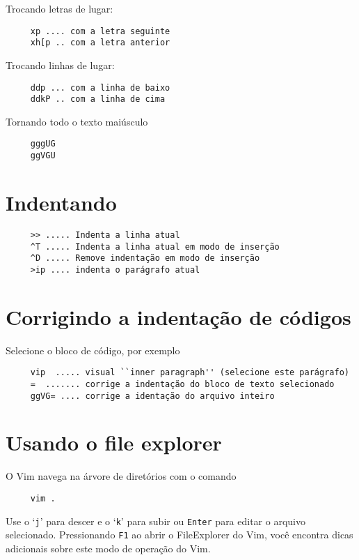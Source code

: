 Trocando letras de lugar:

\begin{verbatim}
     xp .... com a letra seguinte
     xh[p .. com a letra anterior
\end{verbatim}

Trocando linhas de lugar:

\begin{verbatim}
     ddp ... com a linha de baixo
     ddkP .. com a linha de cima
\end{verbatim}

Tornando todo o texto maiúsculo

\begin{verbatim}
     gggUG
     ggVGU
\end{verbatim}

\section{Indentando }

\begin{verbatim}
     >> ..... Indenta a linha atual
     ^T ..... Indenta a linha atual em modo de inserção
     ^D ..... Remove indentação em modo de inserção
     >ip .... indenta o parágrafo atual
\end{verbatim}

\section{Corrigindo a indentação de códigos}
\label{Corrigindo a indentação de códigos}
Selecione o bloco de código, por exemplo

\begin{verbatim}
     vip  ..... visual ``inner paragraph'' (selecione este parágrafo)
     =  ....... corrige a indentação do bloco de texto selecionado
     ggVG= .... corrige a identação do arquivo inteiro
\end{verbatim}

\section{Usando o file explorer}
\label{Usando o file explorer}
O Vim navega na árvore de diretórios com o comando

\begin{verbatim}
     vim .
\end{verbatim}

Use o `{\tt j}' para descer e o `{\tt k}' para subir ou {\tt Enter} para editar o
arquivo selecionado. {\Large {}}  Pressionando {\tt F1} ao abrir o
FileExplorer do Vim, você encontra dicas adicionais sobre este modo de
operação do Vim.

